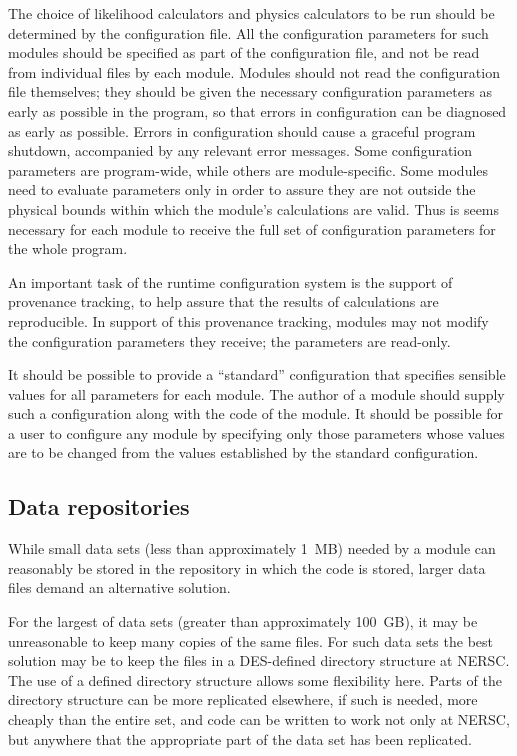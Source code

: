 \documentclass[draftmode,draftwater]{memarticle}
\begin{document}
The choice of likelihood calculators and physics calculators to be run
should be determined by the configuration file. All the configuration
parameters for such modules should be specified as part of the
configuration file, and not be read from individual files by each
module. Modules should not read the configuration file themselves; they
should be given the necessary configuration parameters as early as
possible in the program, so that errors in configuration can be
diagnosed as early as possible. Errors in configuration should cause a
graceful program shutdown, accompanied by any relevant error messages.
Some configuration parameters are program-wide, while others are
module-specific. Some modules need to evaluate parameters only in order
to assure they are not outside the physical bounds within which the
module's calculations are valid. Thus is seems necessary for each module
to receive the full set of configuration parameters for the whole
program.

An important task of the runtime configuration system is the support of
provenance tracking, to help assure that the results of calculations are
reproducible. In support of this provenance tracking, modules may not
modify the configuration parameters they receive; the parameters are
read-only.

It should be possible to provide a ``standard'' configuration that
specifies sensible values for all parameters for each module. The author
of a module should supply such a configuration along with the code of
the module. It should be possible for a user to configure any module by
specifying only those parameters whose values are to be changed from the
values established by the standard configuration.

\subsection{Data repositories}

While small data sets (less than approximately 1~MB) needed by a module can
reasonably be stored in the repository in which the code is stored,
larger data files demand an alternative solution.

For the largest of data sets (greater than approximately 100~GB), it may
be unreasonable to keep many copies of the same files. For such data
sets the best solution may be to keep the files in a DES-defined
directory structure at NERSC. The use of a defined directory structure
allows some flexibility here. Parts of the directory structure can be
more replicated elsewhere, if such is needed, more cheaply than the
entire set, and code can be written to work not only at NERSC, but
anywhere that the appropriate part of the data set has been replicated.
\end{document}
